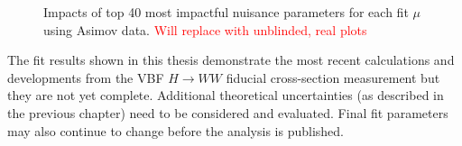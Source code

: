 \begin{figure}[!h]
{  }\hfill
{\caption{Impacts of top 40 most impactful nuisance parameters for each fit $\mu$ using Asimov data. \textcolor{red}{Will replace with unblinded, real plots}
\label{fig:impacts}}}
\end{figure}

The fit results shown in this thesis demonstrate the most recent calculations and developments from the VBF $H\rightarrow WW$ fiducial cross-section measurement but they are not yet complete. Additional theoretical uncertainties (as described in the previous chapter) need to be considered and evaluated. Final fit parameters may also continue to change before the analysis is published. 

